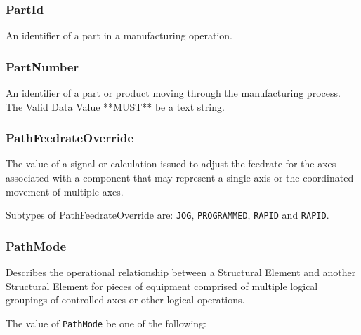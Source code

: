 \subsubsection{PartId}
  \label{sec:PartId}


An identifier of a part in a manufacturing operation.

\FloatBarrier

\subsubsection{PartNumber}
  \label{sec:PartNumber}


An identifier of a part or product moving through the manufacturing process. 
 The \gls{Valid Data Value} **MUST** be a text string. 

\FloatBarrier

\subsubsection{PathFeedrateOverride}
  \label{sec:PathFeedrateOverride}


The value of a signal or calculation issued to adjust the feedrate for the axes associated with a  component that may represent a single axis or the coordinated movement of multiple axes.


Subtypes of PathFeedrateOverride are: \texttt{JOG}, \texttt{PROGRAMMED}, \texttt{RAPID} and \texttt{RAPID}. 
\FloatBarrier

\subsubsection{PathMode}
  \label{sec:PathMode}


Describes the operational relationship between a  \gls{Structural Element} and another  \gls{Structural Element} for pieces of equipment comprised of multiple logical groupings of controlled axes or other logical operations.


The value of \texttt{PathMode} \MUST be one of the following: 

